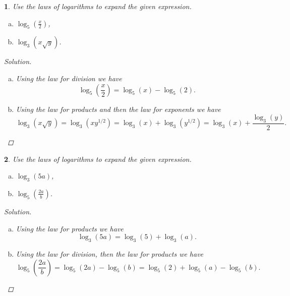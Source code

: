 \documentclass[12pt]{amsart}
\newtheorem{thm}{}
\begin{document}
\setcounter{thm}{11} 
\begin{thm}
  Use the laws of logarithms to expand the given expression.
  \begin{enumerate}[(a)]
  \item
    $\log_5\left(\frac{x}{2}\right)$,
  \item
    $\log_3(x\sqrt{y})$.
  \end{enumerate}

  \begin{proof}[Solution]
    \begin{enumerate}[(a)]
    \item
      Using the law for division we have
      $$\log_5\left(\frac{x}{2}\right) = \log_5(x) - \log_5(2).$$
    \item
      Using the law for products and then the law for exponents we have
      $$\log_3(x\sqrt{y}) = \log_3(xy^{1/2}) = \log_3(x) + \log_3(y^{1/2}) = \log_3(x) + \frac{\log_3(y)}{2}.$$
    \end{enumerate}

  \end{proof}
\end{thm}

\setcounter{thm}{13} 
\begin{thm}
  Use the laws of logarithms to expand the given expression.
  \begin{enumerate}[(a)]
  \item
    $\log_3(5a)$,
  \item
    $\log_5\left(\frac{2a}{b}\right)$.
  \end{enumerate}

  \begin{proof}[Solution]
    \begin{enumerate}[(a)]
    \item
      Using the law for products we have
      $$\log_3(5a) = \log_3(5) + \log_3(a).$$
    \item
      Using the law for division, then the law for products we have
      $$\log_5\left(\frac{2a}{b}\right) = \log_5\left(2a\right) - \log_5\left(b\right) = \log_5\left(2\right) + \log_5\left(a\right) - \log_5\left(b\right).$$
    \end{enumerate}
  \end{proof}
\end{thm}
\end{document}
